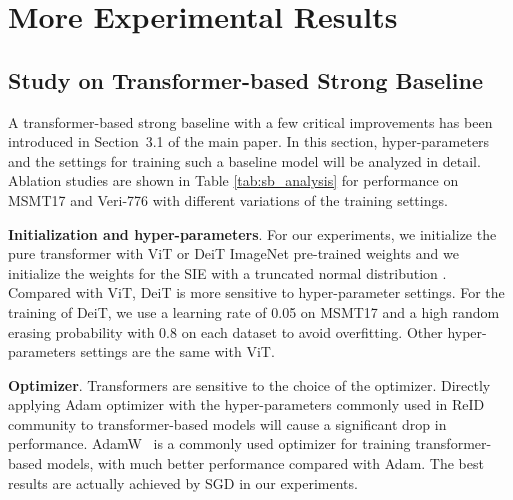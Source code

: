 \documentclass[10pt,twocolumn,letterpaper]{article}
\newcommand{\cmark}{\ding{51}\xspace}\newcommand{\cmarkg}{\textcolor{lightgray}{\ding{51}}\xspace}\newcommand{\xmark}{\ding{55}\xspace}\newcommand{\xmarkg}{\textcolor{lightgray}{\ding{55}}\xspace}\newcommand{\red}[1]{\textcolor{red}{#1}}
\begin{document}
\begin{table*}[b]
\begin{center}
\begin{tabular}{ c|c c c c c c c |cc|cc}
    \hline
    \end{tabular}
    \end{center}
    \vspace{-0.5em}
    \caption{\label{tab:sb_analysis} Ablation study about training settings on MSMT17 and VeRi-776. The first row corresponds to the default configuration employed by our transformer-based strong baseline (ViT-B/16 as default backbones). The symbols \cmark and \xmark indicate that the corresponding setting is included or excluded, respectively. mAP(\%) and R1(\%) accuracy scores are reported. The abbreviations OPT, PE, SP, DO, ADO, STL, LS denote Optimizer, Position Embedding, Stochastic Depth \cite{stoc_depth}, Drop Out, Attention Drop Out, Soft Triplet Loss, Label Smoothing, respectively.}
    \vspace{-0.5em}
\end{table*}


\section{More Experimental Results}


\subsection{Study on Transformer-based Strong Baseline}
A transformer-based strong baseline with a few critical improvements has been introduced in Section~3.1 of the main paper. 
In this section, hyper-parameters and the settings for training such a baseline model will be analyzed in detail. Ablation studies are shown in Table \ref{tab:sb_analysis} for performance on MSMT17 and Veri-776 with different variations of the training settings.

\textbf{Initialization and hyper-parameters}.
 For our experiments, we initialize the pure transformer with ViT or DeiT ImageNet pre-trained weights and we initialize the weights for the SIE with a truncated normal distribution \cite{truncated_normal_dis}. Compared with ViT, DeiT is more sensitive to hyper-parameter settings. For the training of DeiT, we use a learning rate of 0.05 on MSMT17 and a high random erasing probability with 0.8 on each dataset to avoid overfitting. Other hyper-parameters settings are the same with ViT.









\textbf{Optimizer}.
Transformers are sensitive to the choice of the optimizer. Directly applying Adam optimizer with the hyper-parameters commonly used in ReID community \cite{luo2019bag} to transformer-based models will cause a significant drop in performance. AdamW~\cite{AdamW} is a commonly used optimizer for training transformer-based models, with much better performance compared with Adam. The best results are actually achieved by SGD in our experiments.
\end{document}
